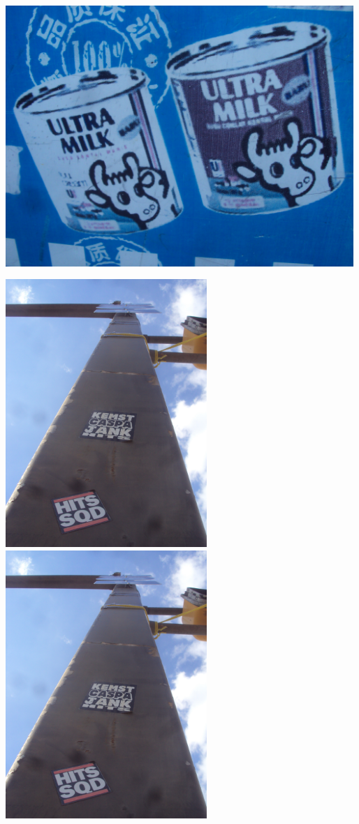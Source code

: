 \documentclass[10pt,letterpaper]{article}
\begin{document}
\includegraphics[width=5.19in]{landscape.jpg}

\vspace{0.25in}
\includegraphics[height=4in]{portrait.jpg}
\includegraphics[height=4in]{portrait.jpg}
\end{document}
